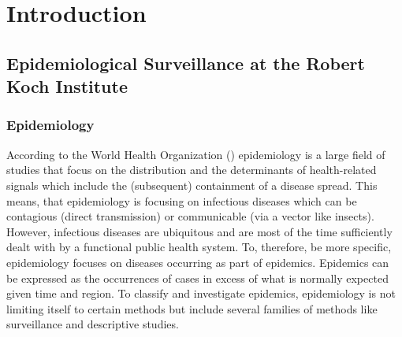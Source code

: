 \chapter{Introduction}
%
%
%


\section{Epidemiological Surveillance at the Robert Koch Institute}

\subsection{Epidemiology}
According to the World Health Organization () \cite{WHOepi} epidemiology is a large field of studies that focus
on the distribution and the determinants of health-related signals which include the (subsequent)
containment of a disease spread. This means, that epidemiology is focusing on infectious diseases which can be contagious (direct transmission) or communicable (via a vector like insects). However, infectious diseases are ubiquitous and are most of the time sufficiently dealt with by a functional public health system. To, therefore, be more specific, epidemiology focuses on diseases occurring as part of epidemics. Epidemics can be expressed as the occurrences of cases in excess of what is normally expected given time and region. To classify and investigate epidemics, epidemiology is not limiting itself to certain methods but include several families of methods like surveillance and descriptive studies.

